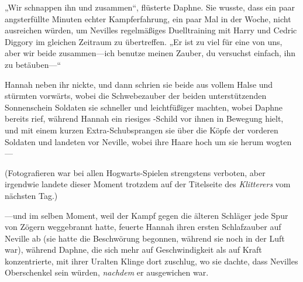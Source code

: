 \later

„Wir schnappen ihn und zusammen“, flüsterte Daphne. Sie wusste, dass ein paar angsterfüllte Minuten echter Kampferfahrung, ein paar Mal in der Woche, nicht ausreichen würden, um Nevilles regelmäßiges Duelltraining mit Harry und Cedric Diggory im gleichen Zeitraum zu übertreffen. „Er ist zu viel für eine von uns, aber wir beide zusammen—ich benutze meinen Zauber, du versuchst einfach, ihn zu betäuben—“

Hannah neben ihr nickte, und dann schrien sie beide aus vollem Halse und stürmten vorwärts, wobei die Schwebezauber der beiden unterstützenden Sonnenschein Soldaten sie schneller und leichtfüßiger machten, wobei Daphne bereits  rief, während Hannah ein riesiges -Schild vor ihnen in Bewegung hielt, und mit einem kurzen Extra-Schubsprangen sie über die Köpfe der vorderen Soldaten und landeten vor Neville, wobei ihre Haare hoch um sie herum wogten—

(Fotografieren war bei allen Hogwarts-Spielen strengstens verboten, aber irgendwie landete dieser Moment trotzdem auf der Titelseite des \emph{Klitterers} vom nächsten Tag.)

—und im selben Moment, weil der Kampf gegen die älteren Schläger jede Spur von Zögern weggebrannt hatte, feuerte Hannah ihren ersten Schlafzauber auf Neville ab (sie hatte die Beschwörung begonnen, während sie noch in der Luft war), während Daphne, die sich mehr auf Geschwindigkeit als auf Kraft konzentrierte, mit ihrer Uralten Klinge dort zuschlug, wo sie dachte, dass Nevilles Oberschenkel sein würden, \emph{nachdem} er ausgewichen war.

